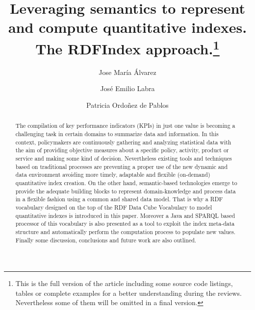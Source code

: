\documentclass{llncs}
\begin{document}
\title{Leveraging semantics to represent and compute quantitative indexes. \\ The RDFIndex approach.\thanks{\scriptsize This is the full version of the article including some source 
code listings, tables or complete examples for a better understanding during the reviews. Nevertheless some of them will be omitted in a final version.}}

\author{Jose Mar\'{i}a \'{A}lvarez \and Jos\'{e} Emilio Labra  \and Patricia Ordoñez de Pablos}






\date{}

\maketitle

\renewcommand{\labelitemi}{$\bullet$}
\small
\begin{abstract}
The compilation of key performance indicators (KPIs) in just one value is 
becoming a challenging task in certain domains to summarize data and information. 
In this context, policymakers are continuously gathering and analyzing statistical 
data with the aim of providing objective measures about a specific policy, activity, 
product or service and making some kind of decision. Nevertheless existing tools 
and techniques based on traditional processes are preventing a 
proper use of the new dynamic and data environment avoiding more timely, 
adaptable and flexible (on-demand) quantitative index creation. On the other hand, 
semantic-based technologies emerge to provide the adequate building blocks 
to represent domain-knowledge and process data in a flexible fashion 
using a common and shared data model. That is why a RDF vocabulary designed on 
the top of the RDF Data Cube Vocabulary to model quantitative indexes 
is introduced in this paper. Moreover a Java and SPARQL based processor 
of this vocabulary is also presented as a tool to exploit the index meta-data structure and automatically 
perform the computation process to populate new values. Finally some discussion, 
conclusions and future work are also outlined.
\end{abstract}
%
\end{document}
